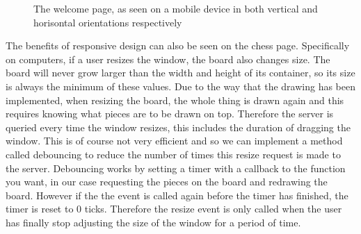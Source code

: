 \begin{figure}
    \begin{center}
        \captionsetup{justification=centering}

        \hspace{1cm}
        \caption{The welcome page, as seen on a mobile device in both vertical and horisontal orientations respectively}
        \label{fig:responsiveDesign}
    \end{center}
\end{figure}

The benefits of responsive design can also be seen on the chess page. Specifically on computers, if a user resizes the window, the board also changes size. The board will never grow larger than the width and height of its container, so its size is always the minimum of these values. Due to the way that the drawing has been implemented, when resizing the board, the whole thing is drawn again and this requires knowing what pieces are to be drawn on top. Therefore the server is queried every time the window resizes, this includes the duration of dragging the window. This is of course not very efficient and so we can implement a method called debouncing \cite{Debouncing} to reduce the number of times this resize request is made to the server. Debouncing works by setting a timer with a callback to the function you want, in our case requesting the pieces on the board and redrawing the board. However if the the event is called again before the timer has finished, the timer is reset to 0 ticks. Therefore the resize event is only called when the user has finally stop adjusting the size of the window for a period of time.